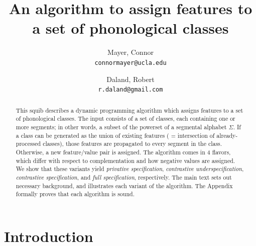 \documentclass[11pt, oneside]{article}   	%
\title{An algorithm to assign features to a set of phonological classes}
\author{}
\author{
  Mayer, Connor \\
  \texttt{connormayer@ucla.edu}
  \and
  Daland, Robert \\
  \texttt{r.daland@gmail.com}
}
\date{\vspace{-5ex}}							%
\begin{document}
\maketitle

\begin{abstract}
This squib describes a dynamic programming algorithm which assigns features to a set of phonological classes. The input consists of a set of classes, each containing one or more segments; in other words, a subset of the powerset of a segmental alphabet $\Sigma$. If a class can be generated as the union of existing features ( = intersection of already-processed classes), those features are propagated to every segment in the class. Otherwise, a new feature/value pair is assigned. The algorithm comes in 4 flavors, which differ with respect to complementation and how negative values are assigned. We show that these variants yield \textit{privative specification}, \textit{contrastive underspecification}, \textit{contrastive specification}, and \textit{full specification}, respectively. The main text sets out necessary background, and illustrates each variant of the algorithm. The Appendix formally proves that each algorithm is sound.
\end{abstract}

\section{Introduction}
\end{document}
